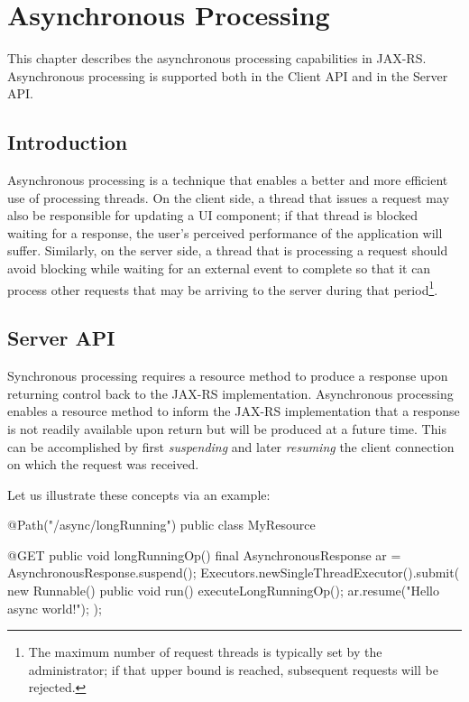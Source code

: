 \chapter{Asynchronous Processing}
\label{asynchronous_processing}

This chapter describes the asynchronous processing capabilities in JAX-RS. Asynchronous processing is supported both in the Client API and in the Server API.

\section{Introduction}
\label{introduction_async}

Asynchronous processing is a technique that enables a better and more efficient use of processing threads. On the client side, a thread that issues a request may also be responsible for updating a UI component; if that thread is blocked waiting for a response, the user's perceived performance of the application will suffer. Similarly, on the server side, a thread that is processing a request should avoid blocking while waiting for an external event to complete so that it can process other requests that may be arriving to the server during that period\footnote{The maximum number of request threads is typically set by the administrator; if that upper bound is reached, subsequent requests will be rejected.}.

\section{Server API}
\label{server_api}

Synchronous processing requires a resource method to produce a response upon returning control back to the JAX-RS implementation. Asynchronous processing enables a resource method to inform the JAX-RS implementation that a response is not readily available upon return but will be produced at a future time. This can be accomplished by first {\em suspending} and later {\em resuming} the client connection on which the request was received. 

Let us illustrate these concepts via an example:

\begin{listing}{1}
@Path("/async/longRunning")
public class MyResource {

    @GET
    public void longRunningOp() {
        final AsynchronousResponse ar = AsynchronousResponse.suspend();
        Executors.newSingleThreadExecutor().submit(
            new Runnable() {
                public void run() {
                    executeLongRunningOp();
                    ar.resume("Hello async world!");
        } });
    } 
}
\end{listing}

